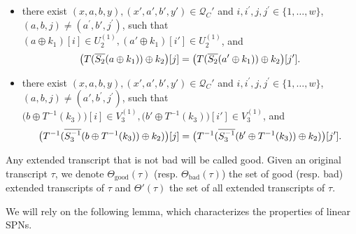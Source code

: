 \begin{definition}
\begin{itemize}[leftmargin=10mm]
	\item[\beight] there exist $(x,a,b,y),(x',a',b',y') \in \mathcal{Q}_{C}'$ and $i, i^{\prime},j, j^{\prime} \in\{1, \ldots, w\}$, $(a,b, j) \neq \left(a^{\prime}, b',j^{\prime}\right)$, such that $(a \oplus k_1)[i]\in U_{2}^{(1)}, (a' \oplus k_1)[i']\in U_{2}^{(1)}$, and
	$$\big(T(\overline{S_2}(a\oplus k_1))\oplus k_2\big)[j]=\big(T(\overline{S_2}(a'\oplus k_1))\oplus k_2\big)[j'].
	$$
	\item[\bnine] there exist $(x,a,b,y),(x',a',b',y') \in \mathcal{Q}_{C}'$ and $i, i^{\prime}, j, j^{\prime} \in\{1, \ldots, w\}$, $(a,b, j) \neq \left(a',b^{\prime}, j^{\prime}\right)$, such that $\big(b \oplus T^{-1}(k_3)\big)[i]\in V_{3}^{(1)}, \big(b' \oplus T^{-1}(k_3)\big)[i']\in V_{3}^{(1)}$, and
	$$\big(T^{-1}(\overline{S_3^{-1}}(b \oplus T^{-1}(k_3))\oplus k_2)\big)[j]=\big(T^{-1}(\overline{S_3^{-1}}(b' \oplus T^{-1}(k_3))\oplus k_2)\big)[j'].
	$$
\end{itemize}
Any extended transcript that is not bad will be called good. Given an original transcript $\tau$, we denote $\Theta_{\mathrm{good}}(\tau)$ (resp. $\Theta_{\mathrm{bad}}(\tau)$) the set of good (resp. bad) extended transcripts of $\tau$ and $\Theta'(\tau)$ the set of all extended transcripts of $\tau$.
\end{definition}





We will rely on the following lemma, which characterizes the properties of linear SPNs.

